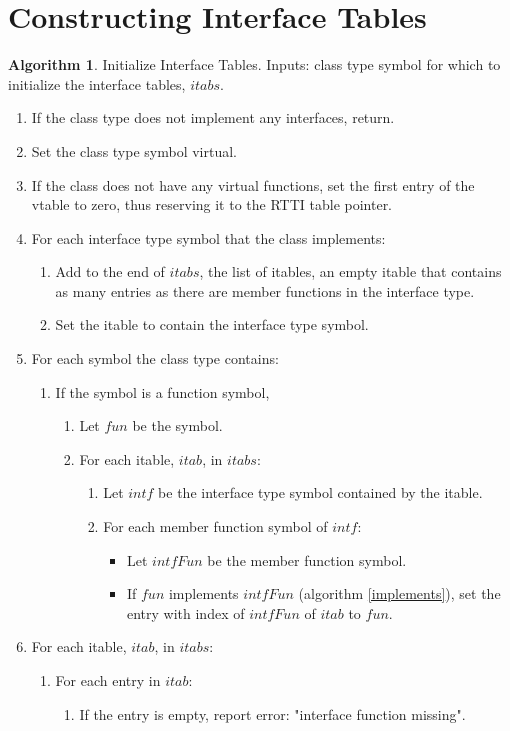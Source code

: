 \documentclass[a4paper,oneside,11pt]{book}
\theoremstyle{definition}
\newtheorem{algo}{Algorithm}[section]
\begin{document}
\section{Constructing Interface Tables}

\begin{algo}\label{inititbls} Initialize Interface Tables. Inputs: class type symbol for which to initialize the interface tables, $itabs$.
\begin{enumerate}
\item
If the class type does not implement any interfaces, return.
\item
Set the class type symbol virtual.
\item
If the class does not have any virtual functions, set the first entry of the vtable to zero, thus reserving it to the RTTI table pointer.
\item
For each interface type symbol that the class implements:
\begin{enumerate}
\item
Add to the end of $itabs$, the list of itables, an empty itable that contains as many entries as there are member functions in the interface type.
\item
Set the itable to contain the interface type symbol.
\end{enumerate}
\item
For each symbol the class type contains:
\begin{enumerate}
\item
If the symbol is a function symbol,
\begin{enumerate}
\item
Let $fun$ be the symbol.
\item
For each itable, $itab$, in $itabs$:
\begin{enumerate}
\item
Let $intf$ be the interface type symbol contained by the itable.
\item
For each member function symbol of $intf$:
\begin{itemize}
\item
Let $intfFun$ be the member function symbol.
\item
If $fun$ implements $intfFun$ (algorithm \ref{implements}), set the entry with index of $intfFun$ of $itab$ to $fun$.
\end{itemize}
\end{enumerate}
\end{enumerate}
\end{enumerate}
\item
For each itable, $itab$, in $itabs$:
\begin{enumerate}
\item
For each entry in $itab$:
\begin{enumerate}
\item
If the entry is empty, report error: "interface function missing".
\end{enumerate}
\end{enumerate}
\end{enumerate}
\end{algo}
\end{document}
